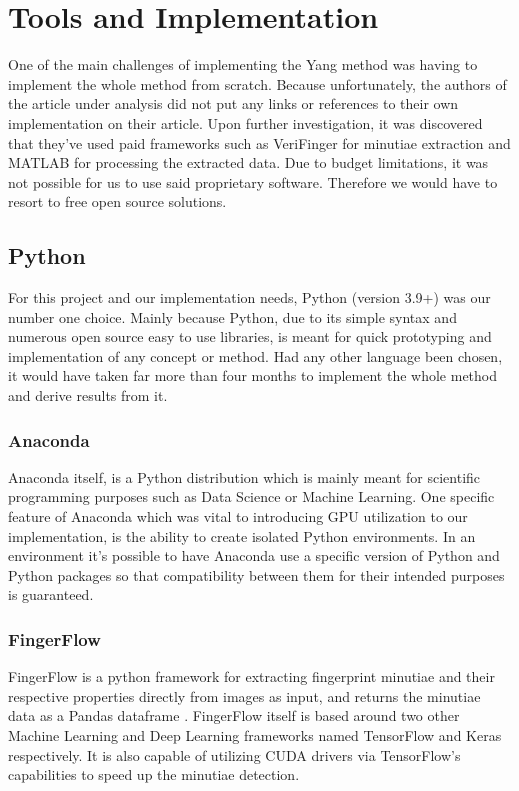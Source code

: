 \documentclass[fyp]{socreport}
\begin{document}
\section{Tools and Implementation}
One of the main challenges of implementing the Yang method was having to implement the whole method from scratch. Because unfortunately, the authors of the article under analysis did not put any links or references to their own implementation on their article. Upon further investigation, it was discovered that they've used paid frameworks such as VeriFinger for minutiae extraction and MATLAB for processing the extracted data. Due to budget limitations, it was not possible for us to use said proprietary software. Therefore we would have to resort to free open source solutions.

\subsection{Python}
For this project and our implementation needs, Python (version 3.9+) was our number one choice. Mainly because Python, due to its simple syntax and numerous open source easy to use libraries, is meant for quick prototyping and implementation of any concept or method. Had any other language been chosen, it would have taken far more than four months to implement the whole method and derive results from it.

\subsubsection{Anaconda}
Anaconda itself, is a Python distribution which is mainly meant for scientific programming purposes such as Data Science or Machine Learning. One specific feature of Anaconda which was vital to introducing GPU utilization to our implementation, is the ability to create isolated Python environments. In an environment it's possible to have Anaconda use a specific version of Python and Python packages so that compatibility between them for their intended purposes is guaranteed.

\subsubsection{FingerFlow}
FingerFlow is a python framework for extracting fingerprint minutiae and their respective properties directly from images as input, and returns the minutiae data as a Pandas dataframe \cite{fingerflow}. FingerFlow itself is based around two other Machine Learning and Deep Learning frameworks named TensorFlow and Keras respectively. It is also capable of utilizing CUDA drivers via TensorFlow's capabilities to speed up the minutiae detection.
\end{document}
